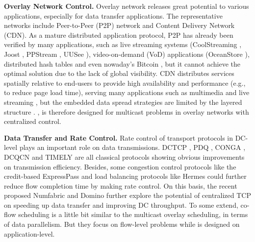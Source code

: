 \textbf{Overlay Network Control.}
Overlay network releases great potential to various applications, especially for data transfer applications. The representative networks include Peer-to-Peer (P2P) network and Content Delivery Network (CDN). As a mature distributed application protocol, P2P has already been verified by many applications, such as live streaming systems (CoolStreaming \cite{zhang2005coolstreaming}, Joost \cite{Joost}, PPStream \cite{PPStream}, UUSee \cite{UUSee}), video-on-demand (VoD) applications (OceanStore \cite{oceanstore}), distributed hash tables \cite{rhea2005opendht} and even nowaday's Bitcoin \cite{eyal2016bitcoin}, but it cannot achieve the optimal solution due to the lack of global visibility. CDN distributes services spatially relative to end-users to provide high availability and performance (e.g., to reduce page load time), serving many applications such as multimedia \cite{zhu2011multimedia} and live streaming \cite{sripanidkulchai2004analysis}, but the embedded data spread strategies are limited by the layered structure \cite{kostic2003bullet}. \name, is therefore designed for multicast problems in overlay networks with centralized control.

\textbf{Data Transfer and Rate Control.}
Rate control of transport protocols in DC-level plays an important role on data transmissions. DCTCP \cite{Alizadeh2010Data}, PDQ \cite{Hong2012Finishing}, CONGA \cite{Alizadeh2014CONGA}, DCQCN \cite{Zhu2015Congestion} and TIMELY \cite{Mittal2015TIMELY} are all classical protocols showing obvious improvements on transmission efficiency. Besides, some congestion control protocols like the credit-based ExpressPass \cite{Han2017Credit} and load balancing protocols like Hermes \cite{Zhang2017Resilient} could further reduce flow completion time by making rate control. On this basis, the recent proposed Numfabric \cite{nagaraj2016numfabric} and Domino \cite{sivaraman2016packet} further explore the potential of centralized TCP on speeding up data transfer and improving DC throughput. To some extend, co-flow scheduling \cite{Chowdhury2012Coflow,Zhang2016CODA} is a little bit similar to the multicast overlay scheduling, in terms of data parallelism. But they focus on flow-level problems while \name is designed on application-level.%

